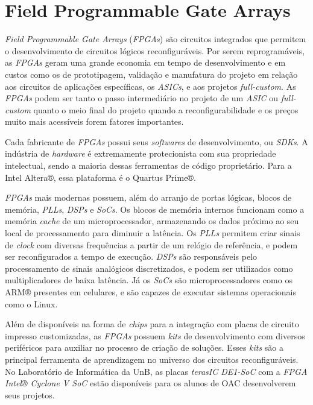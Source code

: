 \section{Field Programmable Gate Arrays}
{
    \textit{Field Programmable Gate Arrays} (\textit{FPGAs}) são circuitos
    integrados que permitem o desenvolvimento de circuitos lógicos
    reconfiguráveis. Por serem reprogramáveis, as \textit{FPGAs} geram uma
    grande economia em tempo de desenvolvimento e em custos como os de
    prototipagem, validação e manufatura do projeto em relação aos circuitos de
    aplicações específicas, os \textit{ASICs}, e aos projetos
    \textit{full-custom}. As \textit{FPGAs} podem ser tanto o passo
    intermediário no projeto de um \textit{ASIC} ou \textit{full-custom} quanto
    o meio final do projeto quando a reconfigurabilidade e os preços muito mais
    acessíveis forem fatores importantes.

    Cada fabricante de \textit{FPGAs} possui seus \textit{softwares} de
    desenvolvimento, ou \textit{SDKs}. A indústria de \textit{hardware} é
    extremamente protecionista com sua propriedade intelectual, sendo a maioria
    dessas ferramentas de código proprietário. Para a Intel Altera®, essa
    plataforma é o Quartus Prime®.

    \textit{FPGAs} mais modernas possuem, além do arranjo de portas lógicas,
    blocos de memória, \textit{PLLs}, \textit{DSPs} e \textit{SoCs}. Os blocos
    de memória internos funcionam como a memória \textit{cache} de um
    microprocessador, armazenando os dados próximo ao seu local de
    processamento para diminuir a latência. Os \textit{PLLs} permitem criar
    sinais de \textit{clock} com diversas frequências a partir de um relógio de
    referência, e podem ser reconfigurados a tempo de execução. \textit{DSPs}
    são responsáveis pelo processamento de sinais analógicos discretizados, e
    podem ser utilizados como multiplicadores de baixa latência. Já os
    \textit{SoCs} são microprocessadores como os ARM® presentes em celulares,
    e são capazes de executar sistemas operacionais como o Linux.

    Além de disponíveis na forma de \textit{chips} para a integração com placas
    de circuito impresso customizadas, as \textit{FPGAs} possuem \textit{kits}
    de desenvolvimento com diversos periféricos para auxiliar no processo de
    criação de soluções. Esses \textit{kits} são a principal ferramenta de
    aprendizagem no universo dos circuitos reconfiguráveis. No Laboratório de
    Informática da UnB, as placas \textit{terasIC DE1-SoC} com a \textit{FPGA
    Intel® Cyclone V SoC} estão disponíveis para os alunos de OAC desenvolverem
    seus projetos.
}

